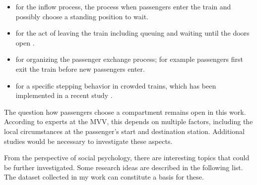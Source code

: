 \begin{itemize}[noitemsep,nolistsep]

  \item for the inflow process, \ie the process when passengers enter the train and
    possibly choose a standing position to wait.

  \item for the act of leaving the train including queuing and waiting until the
    doors open \citep{zoennchen-2013,koster-2015b,seitz-2016c}.

  \item for organizing the passenger exchange process; for example passengers
    first exit the train before new passengers enter.

  \item for a specific stepping behavior in crowded trains, which has been
    implemented in a recent study \citep{sivers-2015}.

\end{itemize}

The question how passengers choose a compartment remains open in this work.
According to experts at the \acf{MVV}\citemvv, this depends on multiple factors,
including the local circumstances at the passenger's start and destination
station.
Additional studies would be necessary to investigate these aspects.

From the perspective of social psychology, there are interesting topics that
could be further investigated.
Some research ideas are described in the following list.
The dataset collected in my work can constitute a basis for these.

